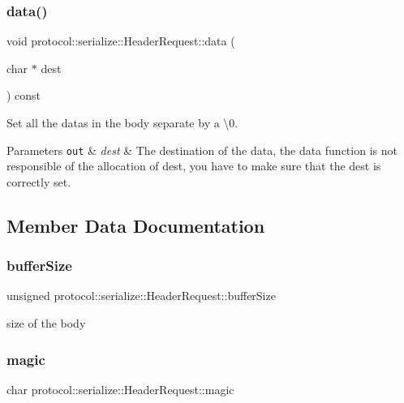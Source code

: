 \subsubsection{\texorpdfstring{data()}{data()}}
{\footnotesize\ttfamily void protocol\+::serialize\+::\+Header\+Request\+::data (\begin{DoxyParamCaption}\item[{char $\ast$}]{dest }\end{DoxyParamCaption}) const}



Set all the datas in the body separate by a \textbackslash{}0. 


\begin{DoxyParams}[1]{Parameters}
\mbox{\tt out}  & {\em dest} & The destination of the data, the data function is not responsible of the allocation of dest, you have to make sure that the dest is correctly set. \\
\hline
\end{DoxyParams}


\subsection{Member Data Documentation}
\mbox{\label{structprotocol_1_1serialize_1_1_header_request_a60ceae16d905c732b6b307d09012f935}} 
\subsubsection{\texorpdfstring{buffer\+Size}{bufferSize}}
{\footnotesize\ttfamily unsigned protocol\+::serialize\+::\+Header\+Request\+::buffer\+Size}

size of the body \mbox{\label{structprotocol_1_1serialize_1_1_header_request_ab7c26d951ffb1bbac4622ac5a9f9dbc1}} 
\subsubsection{\texorpdfstring{magic}{magic}}
{\footnotesize\ttfamily char protocol\+::serialize\+::\+Header\+Request\+::magic}

